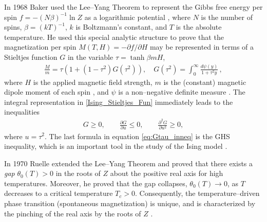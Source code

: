 \documentclass[english,12pt,jmp,graphicx]{revtex4-1}
\begin{document}
In 1968 Baker \cite{Baker:PRL-990} used the Lee--Yang Theorem to represent the Gibbs
free energy per spin $f=-(N\beta)^{-1}\ln{Z}$ as a logarithmic potential
\cite{Saff_Totik:97}, where $N$ is the number of spins, $\beta=(kT)^{-1}$,
$k$ is Boltzmann's constant, and $T$ is the absolute temperature.
He used this special analytic structure to prove
that the magnetization per spin $M(T,H)=-\partial f/\partial H$
\cite{Robertson-1993} may be represented in terms of a Stieltjes
function $G$ in the variable $\tau=\tanh{\beta mH}$,          
%
\begin{align}\label{Ising_Stieltjes_Fun}
  \frac{M}{m} =\tau(1+(1-\tau^2)G(\tau^2)), \quad
  G(\tau^2)=\int_0^\infty\frac{d\psi(y)}{1+\tau^2y}\,, %
\end{align}
%
where $H$ is the applied magnetic field strength, $m$ is the
(constant) magnetic dipole moment of each spin \cite{Griffiths-1999},
and $\psi$ is a non--negative definite measure
\cite{Baker:PRL-990,Baker-1990}. The integral representation in
\eqref{Ising_Stieltjes_Fun} immediately leads to the inequalities    
%
\begin{align}\label{eq:Gtau_inneq}
  G\geq0, \qquad \frac{\partial G}{\partial u}\leq0, \qquad \frac{\partial^2G}{\partial u^2}\geq0,
\end{align}
%
where $u=\tau^2$. The last formula in equation \eqref{eq:Gtau_inneq} is
the GHS inequality, which is an important tool in the study of the
Ising model \cite{Baker-1990,Golden:JMP-5627}. 

In 1970 Ruelle  \cite{Ruelle:PRL:303} extended the Lee--Yang Theorem and proved that
there exists a \emph{gap} $\theta_0(T)>0$ in the roots of $Z$ about the positive
real axis for high temperatures. Moreover, he
proved that the gap collapses, $\theta_0(T)\to0$, as $T$ decreases to a
critical temperature $T_c>0$. Consequently, the temperature--driven
phase transition (spontaneous magnetization) is unique, and is
characterized by the pinching of the real axis by the roots of $Z$
\cite{Ruelle-1969}.   
\end{document}
